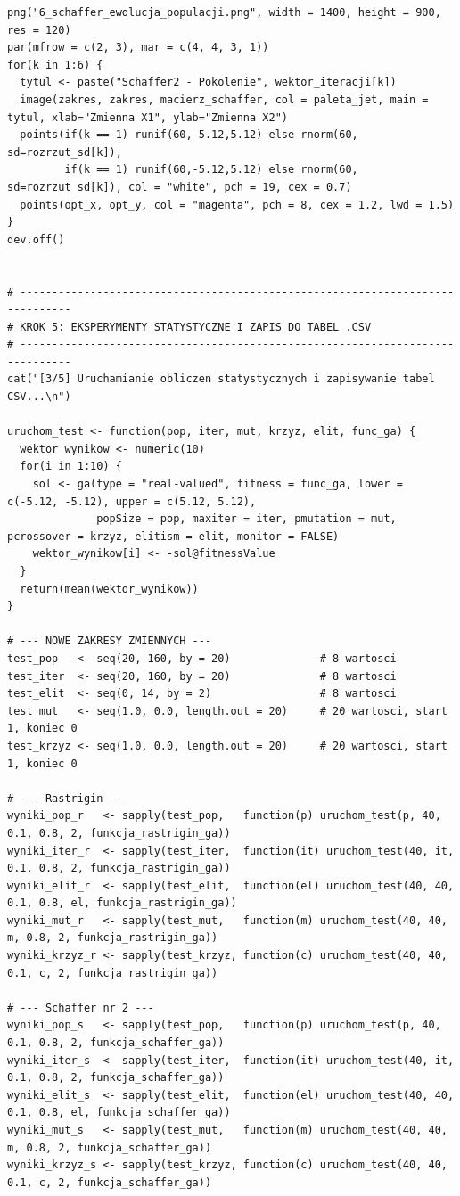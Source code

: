 \documentclass[a4paper,12pt]{article}
\begin{document}
\begin{lstlisting}
png("6_schaffer_ewolucja_populacji.png", width = 1400, height = 900, res = 120)
par(mfrow = c(2, 3), mar = c(4, 4, 3, 1))
for(k in 1:6) {
  tytul <- paste("Schaffer2 - Pokolenie", wektor_iteracji[k])
  image(zakres, zakres, macierz_schaffer, col = paleta_jet, main = tytul, xlab="Zmienna X1", ylab="Zmienna X2")
  points(if(k == 1) runif(60,-5.12,5.12) else rnorm(60, sd=rozrzut_sd[k]), 
         if(k == 1) runif(60,-5.12,5.12) else rnorm(60, sd=rozrzut_sd[k]), col = "white", pch = 19, cex = 0.7)
  points(opt_x, opt_y, col = "magenta", pch = 8, cex = 1.2, lwd = 1.5)
}
dev.off()


# ------------------------------------------------------------------------------
# KROK 5: EKSPERYMENTY STATYSTYCZNE I ZAPIS DO TABEL .CSV
# ------------------------------------------------------------------------------
cat("[3/5] Uruchamianie obliczen statystycznych i zapisywanie tabel CSV...\n")

uruchom_test <- function(pop, iter, mut, krzyz, elit, func_ga) {
  wektor_wynikow <- numeric(10)
  for(i in 1:10) {
    sol <- ga(type = "real-valued", fitness = func_ga, lower = c(-5.12, -5.12), upper = c(5.12, 5.12),
              popSize = pop, maxiter = iter, pmutation = mut, pcrossover = krzyz, elitism = elit, monitor = FALSE)
    wektor_wynikow[i] <- -sol@fitnessValue
  }
  return(mean(wektor_wynikow))
}

# --- NOWE ZAKRESY ZMIENNYCH ---
test_pop   <- seq(20, 160, by = 20)              # 8 wartosci
test_iter  <- seq(20, 160, by = 20)              # 8 wartosci
test_elit  <- seq(0, 14, by = 2)                 # 8 wartosci
test_mut   <- seq(1.0, 0.0, length.out = 20)     # 20 wartosci, start 1, koniec 0
test_krzyz <- seq(1.0, 0.0, length.out = 20)     # 20 wartosci, start 1, koniec 0

# --- Rastrigin ---
wyniki_pop_r   <- sapply(test_pop,   function(p) uruchom_test(p, 40, 0.1, 0.8, 2, funkcja_rastrigin_ga))
wyniki_iter_r  <- sapply(test_iter,  function(it) uruchom_test(40, it, 0.1, 0.8, 2, funkcja_rastrigin_ga))
wyniki_elit_r  <- sapply(test_elit,  function(el) uruchom_test(40, 40, 0.1, 0.8, el, funkcja_rastrigin_ga))
wyniki_mut_r   <- sapply(test_mut,   function(m) uruchom_test(40, 40, m, 0.8, 2, funkcja_rastrigin_ga))
wyniki_krzyz_r <- sapply(test_krzyz, function(c) uruchom_test(40, 40, 0.1, c, 2, funkcja_rastrigin_ga))

# --- Schaffer nr 2 ---
wyniki_pop_s   <- sapply(test_pop,   function(p) uruchom_test(p, 40, 0.1, 0.8, 2, funkcja_schaffer_ga))
wyniki_iter_s  <- sapply(test_iter,  function(it) uruchom_test(40, it, 0.1, 0.8, 2, funkcja_schaffer_ga))
wyniki_elit_s  <- sapply(test_elit,  function(el) uruchom_test(40, 40, 0.1, 0.8, el, funkcja_schaffer_ga))
wyniki_mut_s   <- sapply(test_mut,   function(m) uruchom_test(40, 40, m, 0.8, 2, funkcja_schaffer_ga))
wyniki_krzyz_s <- sapply(test_krzyz, function(c) uruchom_test(40, 40, 0.1, c, 2, funkcja_schaffer_ga))


\end{lstlisting}
\end{document}

